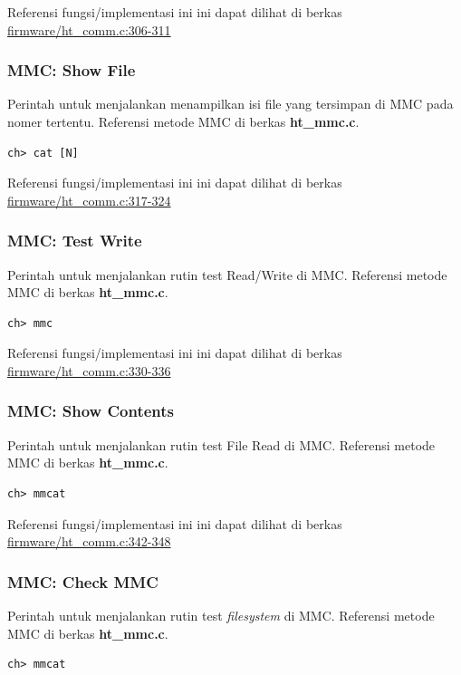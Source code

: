 \documentclass[12pt,]{article}
\begin{document}
	Referensi fungsi/implementasi ini ini dapat dilihat di berkas
	\href{https://github.com/VibrasticLab/pikoakustik/blob/stm32f401re_3pin/firmware/ht_comm.c#L306-L311}{firmware/ht\_comm.c:306-311}
	
	\subsubsection{MMC: Show File}
	Perintah untuk menjalankan menampilkan isi file yang tersimpan di MMC pada nomer tertentu.
	Referensi metode MMC di berkas \textbf{ht\_mmc.c}.
	\begin{verbatim}
ch> cat [N]
	\end{verbatim}
	
	Referensi fungsi/implementasi ini ini dapat dilihat di berkas
	\href{https://github.com/VibrasticLab/pikoakustik/blob/stm32f401re_3pin/firmware/ht_comm.c#L317-L324}{firmware/ht\_comm.c:317-324}
	
	\subsubsection{MMC: Test Write}
	Perintah untuk menjalankan rutin test Read/Write di MMC.
	Referensi metode MMC di berkas \textbf{ht\_mmc.c}.
	\begin{verbatim}
ch> mmc
	\end{verbatim}
	
	Referensi fungsi/implementasi ini ini dapat dilihat di berkas
	\href{https://github.com/VibrasticLab/pikoakustik/blob/stm32f401re_3pin/firmware/ht_comm.c#L330-L336}{firmware/ht\_comm.c:330-336}
	
	\subsubsection{MMC: Show Contents}
	Perintah untuk menjalankan rutin test File Read di MMC.
	Referensi metode MMC di berkas \textbf{ht\_mmc.c}.
	\begin{verbatim}
ch> mmcat
	\end{verbatim}
	
	Referensi fungsi/implementasi ini ini dapat dilihat di berkas
	\href{https://github.com/VibrasticLab/pikoakustik/blob/stm32f401re_3pin/firmware/ht_comm.c#L342-L348}{firmware/ht\_comm.c:342-348}
	
	\subsubsection{MMC: Check MMC}
	Perintah untuk menjalankan rutin test \textit{filesystem} di MMC.
	Referensi metode MMC di berkas \textbf{ht\_mmc.c}.
	\begin{verbatim}
ch> mmcat
	\end{verbatim}
	
\end{document}
